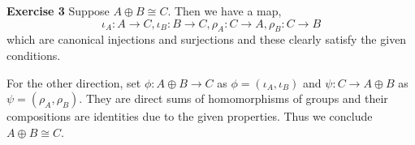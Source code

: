 \documentclass[10pt]{article}
\DeclareMathOperator{\coker}{coker}
\begin{document}
\begin{center}
\end{center}
\par\textbf{Exercise 3}
Suppose $A\oplus B\cong C$. Then we have a map,
\begin{equation*}
    \iota_A:A\to C,\iota_B:B\to C, \rho_A:C\to A,\rho_B:C\to B
\end{equation*}
which are canonical injections and surjections and these clearly satisfy the given conditions.
\par For the other direction, set $\phi:A\oplus B\to C$ as $\phi = (\iota_A,\iota_B)$ and $\psi:C\to A\oplus B$ as $\psi=(\rho_A,\rho_B)$. They are direct sums of homomorphisms of groups and their compositions are identities due to the given properties. Thus we conclude $A\oplus B\cong C$.
\end{document}
